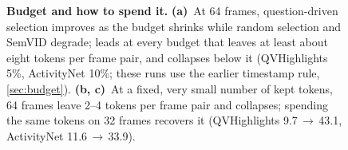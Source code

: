 \begin{figure}[t]
{}
\caption{\textbf{Budget and how to spend it.} \textbf{(a)}~At 64 frames, question-driven selection improves as the
budget shrinks while random selection and SemVID degrade; \method leads at every budget that leaves at least
about eight tokens per frame pair, and collapses below it (QVHighlights 5\%, ActivityNet 10\%; these runs use the earlier timestamp rule, \cref{sec:budget}). \textbf{(b, c)}~At a fixed,
very small number of kept tokens, 64 frames leave 2--4 tokens per frame pair and \method collapses; spending the same
tokens on 32 frames recovers it (QVHighlights 9.7\,$\rightarrow$\,43.1, ActivityNet 11.6\,$\rightarrow$\,33.9).}
\label{fig:budget}
\end{figure}
